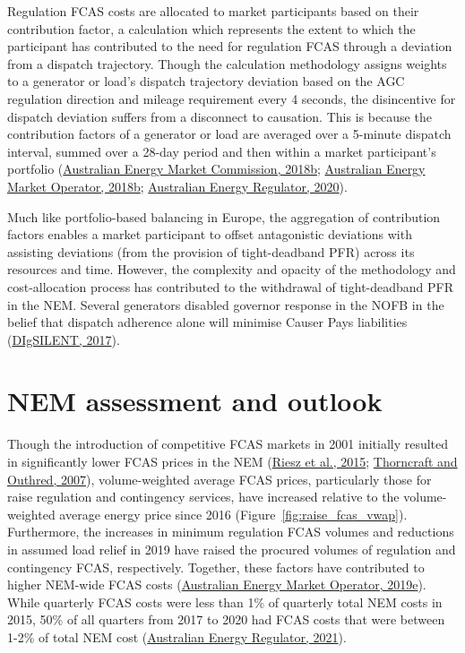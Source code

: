 \documentclass[12pt,a4paper,]{report}
\begin{document}
Regulation FCAS costs are allocated to market participants based on
their contribution factor, a calculation which represents the extent to
which the participant has contributed to the need for regulation FCAS
through a deviation from a dispatch trajectory. Though the calculation
methodology assigns weights to a generator or load's dispatch trajectory
deviation based on the AGC regulation direction and mileage requirement
every 4 seconds, the disincentive for dispatch deviation suffers from a
disconnect to causation. This is because the contribution factors of a
generator or load are averaged over a 5-minute dispatch interval, summed
over a 28-day period and then within a market participant's portfolio
(\protect\hyperlink{ref-australianenergymarketcommissionFrequencyControlFrameworks2018}{Australian
Energy Market Commission, 2018b};
\protect\hyperlink{ref-australianenergymarketoperatorRegulationFCASContribution2018a}{Australian
Energy Market Operator, 2018b};
\protect\hyperlink{ref-australianenergyregulatorIssuesPaperSemi2020}{Australian
Energy Regulator, 2020}).

Much like portfolio-based balancing in Europe, the aggregation of
contribution factors enables a market participant to offset antagonistic
deviations with assisting deviations (from the provision of
tight-deadband PFR) across its resources and time. However, the
complexity and opacity of the methodology and cost-allocation process
has contributed to the withdrawal of tight-deadband PFR in the NEM.
Several generators disabled governor response in the NOFB in the belief
that dispatch adherence alone will minimise Causer Pays liabilities
(\protect\hyperlink{ref-digsilentReviewFrequencyControl2017}{DIgSILENT,
2017}).

\hypertarget{nem-assessment-and-outlook}{%
\section{NEM assessment and outlook}\label{nem-assessment-and-outlook}}

Though the introduction of competitive FCAS markets in 2001 initially
resulted in significantly lower FCAS prices in the NEM
(\protect\hyperlink{ref-rieszFrequencyControlAncillary2015}{Riesz et
al., 2015};
\protect\hyperlink{ref-thorncraftExperienceMarketbasedAncillary2007}{Thorncraft
and Outhred, 2007}), volume-weighted average FCAS prices, particularly
those for raise regulation and contingency services, have increased
relative to the volume-weighted average energy price since 2016
(Figure~\ref{fig:raise_fcas_vwap}). Furthermore, the increases in
minimum regulation FCAS volumes and reductions in assumed load relief in
2019 have raised the procured volumes of regulation and contingency
FCAS, respectively. Together, these factors have contributed to higher
NEM-wide FCAS costs
(\protect\hyperlink{ref-australianenergymarketoperatorReviewNEMLoad2019}{Australian
Energy Market Operator, 2019e}). While quarterly FCAS costs were less
than 1\% of quarterly total NEM costs in 2015, 50\% of all quarters from
2017 to 2020 had FCAS costs that were between 1-2\% of total NEM cost
(\protect\hyperlink{ref-australianenergyregulatorStateEnergyMarket2021}{Australian
Energy Regulator, 2021}).
\end{document}
